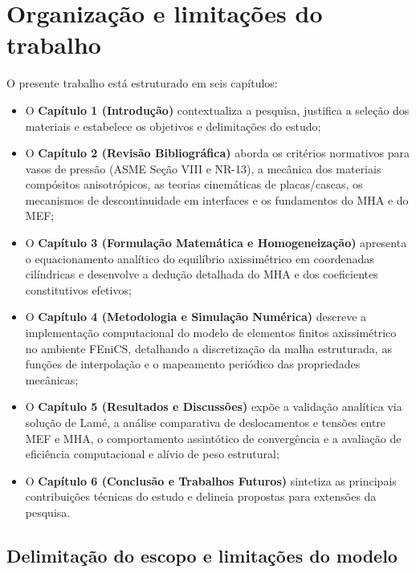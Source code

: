 \section{Organização e limitações do trabalho}

O presente trabalho está estruturado em seis capítulos:
\begin{itemize}
    \item O \textbf{Capítulo 1 (Introdução)} contextualiza a pesquisa, justifica a seleção dos materiais e estabelece os objetivos e delimitações do estudo;
    \item O \textbf{Capítulo 2 (Revisão Bibliográfica)} aborda os critérios normativos para vasos de pressão (ASME Seção VIII e NR-13), a mecânica dos materiais compósitos anisotrópicos, as teorias cinemáticas de placas/cascas, os mecanismos de descontinuidade em interfaces e os fundamentos do MHA e do MEF;
    \item O \textbf{Capítulo 3 (Formulação Matemática e Homogeneização)} apresenta o equacionamento analítico do equilíbrio axissimétrico em coordenadas cilíndricas e desenvolve a dedução detalhada do MHA e dos coeficientes constitutivos efetivos;
    \item O \textbf{Capítulo 4 (Metodologia e Simulação Numérica)} descreve a implementação computacional do modelo de elementos finitos axissimétrico no ambiente FEniCS, detalhando a discretização da malha estruturada, as funções de interpolação e o mapeamento periódico das propriedades mecânicas;
    \item O \textbf{Capítulo 5 (Resultados e Discussões)} expõe a validação analítica via solução de Lamé, a análise comparativa de deslocamentos e tensões entre MEF e MHA, o comportamento assintótico de convergência e a avaliação de eficiência computacional e alívio de peso estrutural;
    \item O \textbf{Capítulo 6 (Conclusão e Trabalhos Futuros)} sintetiza as principais contribuições técnicas do estudo e delineia propostas para extensões da pesquisa.
\end{itemize}

\subsection{Delimitação do escopo e limitações do modelo}

